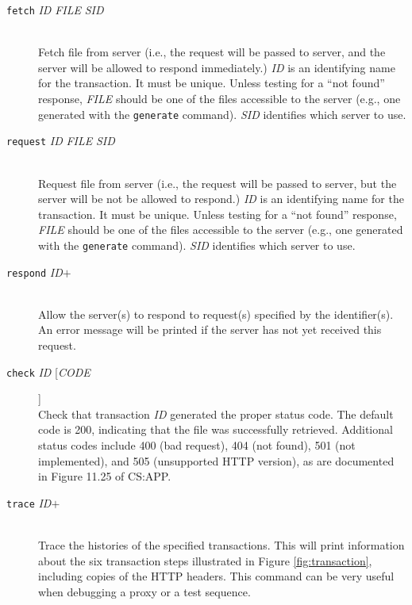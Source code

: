 \documentclass[11pt]{article}
\begin{document}
\begin{description}
\item[\texttt{fetch} \textit{ID} \textit{FILE} \textit{SID}]  $\;$ \\
    Fetch file from server (i.e., the request will be passed to
    server, and the server will be allowed to respond immediately.)
    \textit{ID} is an identifying name for the transaction.  It must
    be unique.  Unless testing for a ``not found'' response, \textit{FILE} should be one of the files accessible to
    the server (e.g., one generated with the \texttt{generate} command).
    \textit{SID} identifies which server to use.

\item[\texttt{request} \textit{ID} \textit{FILE} \textit{SID}]  $\;$ \\
    Request file from server (i.e., the request will be passed to
    server, but the server will be not be allowed to respond.)
    \textit{ID} is an identifying name for the transaction.  It must
    be unique.  Unless testing for a ``not found'' response, \textit{FILE} should be one of the files accessible to
    the server (e.g., one generated with the \texttt{generate} command).
    \textit{SID} identifies which server to use.

\item[\texttt{respond} \textit{ID}$+$]  $\;$ \\
    Allow the server(s) to respond to request(s) specified by the
    identifier(s).  An error message will be printed if the server has
    not yet received this request.

\item[\texttt{check} \textit{ID} [\textit{CODE}]]  $\;$ \\
    Check that transaction \textit{ID} generated the proper status
    code.  The default code is 200, indicating that the file was
    successfully retrieved.    Additional status
codes include 400 (bad request), 404 (not
found), 501 (not implemented), and 505 (unsupported HTTP version), as
are documented in Figure 11.25 of CS:APP\@.

\item[\texttt{trace} \textit{ID}$+$]  $\;$ \\
    Trace the histories of the specified transactions.
    This will print information about the six transaction steps illustrated in
    Figure \ref{fig:transaction}, including copies of the HTTP
    headers. This command can be very useful when debugging a proxy or
    a test sequence.
\end{description}
\end{document}

